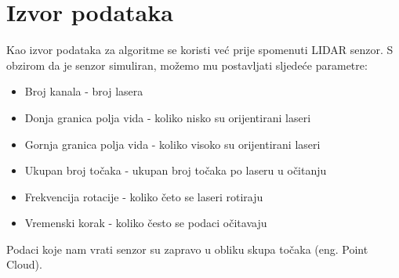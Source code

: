 \section{Izvor podataka}
Kao izvor podataka za algoritme se koristi već prije spomenuti LIDAR senzor. S obzirom da je senzor simuliran, možemo mu postavljati sljedeće parametre:

\begin{itemize}
  \item Broj kanala - broj lasera
  \item Donja granica polja vida - koliko nisko su orijentirani laseri
  \item Gornja granica polja vida - koliko visoko su orijentirani laseri
  \item Ukupan broj točaka - ukupan broj točaka po laseru u očitanju
  \item Frekvencija rotacije - koliko četo se laseri rotiraju
  \item Vremenski korak - koliko često se podaci očitavaju
\end{itemize}

Podaci koje nam vrati senzor su zapravo u obliku skupa točaka (eng. Point Cloud).